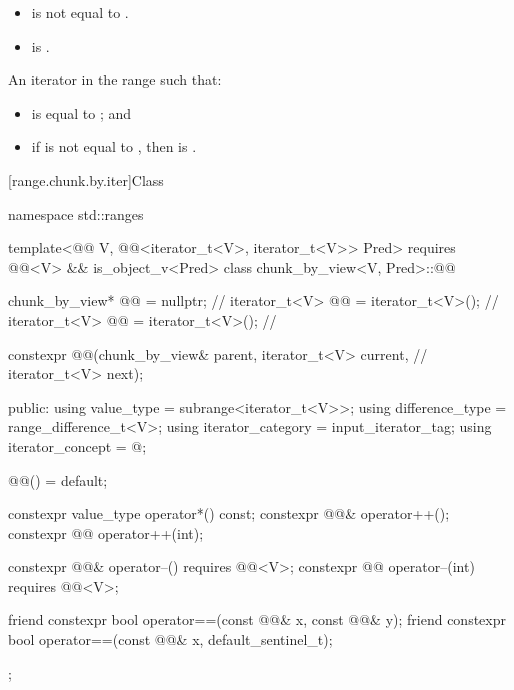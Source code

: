\begin{itemdescr}
\pnum
\expects
\begin{itemize}
\item
{} is not equal to .
\item
{} is .
\end{itemize}

\pnum
\returns
An iterator 
in the range  such that:
\begin{itemize}
\item
{} is equal to ; and
\item
if  is not equal to ,
then 
is .
\end{itemize}
\end{itemdescr}

[range.chunk.by.iter]{Class }

\begin{codeblock}
namespace std::ranges {
  template<@@ V, @@<iterator_t<V>, iterator_t<V>> Pred>
    requires @@<V> && is_object_v<Pred>
  class chunk_by_view<V, Pred>::@@ {
    chunk_by_view* @@ = nullptr;                                   // \expos
    iterator_t<V> @@ = iterator_t<V>();                           // \expos
    iterator_t<V> @@    = iterator_t<V>();                           // \expos

    constexpr @@(chunk_by_view& parent, iterator_t<V> current,    // \expos
                       iterator_t<V> next);

  public:
    using value_type = subrange<iterator_t<V>>;
    using difference_type  = range_difference_t<V>;
    using iterator_category = input_iterator_tag;
    using iterator_concept = @\seebelow@;

    @@() = default;

    constexpr value_type operator*() const;
    constexpr @@& operator++();
    constexpr @@ operator++(int);

    constexpr @@& operator--() requires @@<V>;
    constexpr @@ operator--(int) requires @@<V>;

    friend constexpr bool operator==(const @@& x, const @@& y);
    friend constexpr bool operator==(const @@& x, default_sentinel_t);
  };
}
\end{codeblock}

